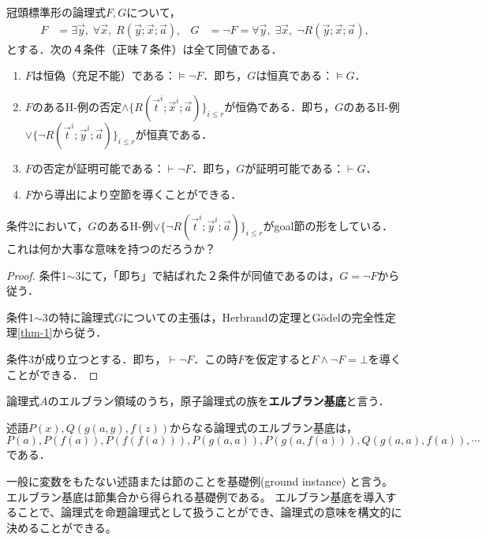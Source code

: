 \documentclass[uplatex, 12pt, dvipdfmx]{jsreport}
\begin{document}
\begin{corollary}\label{cor-Herbrand}
    冠頭標準形の論理式$F,G$について，
    \begin{align*}
        F&=\exists\vec{y},\;\forall\vec{x},\;R(\vec{y};\vec{x};\vec{a}),& G&=\lnot F=\forall\vec{y},\;\exists\vec{x},\;\lnot R(\vec{y};\vec{x};\vec{a}),
    \end{align*}
    とする．次の４条件（正味７条件）は全て同値である．
    \begin{enumerate}
        \item $F$は恒偽（充足不能）である：$\vDash\lnot F$．即ち，$G$は恒真である：$\vDash G$．
        \item $F$のあるH-例の否定$\land\{R(\vec{t}^i;\vec{x}^i;\vec{a})\}_{i\le r}$が恒偽である．即ち，$G$のあるH-例$\lor\{\lnot R(\vec{t}^i;\vec{y}^i;\vec{a})\}_{i\le r}$が恒真である．
        \item $F$の否定が証明可能である：$\vdash\lnot F$．即ち，$G$が証明可能である：$\vdash G$．
        \item $F$から導出により空節を導くことができる．
    \end{enumerate}
\end{corollary}
\begin{remark}
    条件2において，$G$のあるH-例$\lor\{\lnot R(\vec{t}^i;\vec{y}^i;\vec{a})\}_{i\le r}$がgoal節の形をしている．
    これは何か大事な意味を持つのだろうか？
\end{remark}
\begin{proof}
    条件1$\sim$3にて，「即ち」で結ばれた２条件が同値であるのは，$G=\lnot F$から従う．

    条件1$\sim$3の特に論理式$G$についての主張は，Herbrandの定理とGödelの完全性定理\ref{thm-1}から従う．

    条件3が成り立つとする．即ち，$\vdash\lnot F$．この時$F$を仮定すると$F\land\lnot F=\bot$を導くことができる．
\end{proof}

\begin{definition}
    論理式$A$のエルブラン領域のうち，原子論理式の族を\textbf{エルブラン基底}と言う．
\end{definition}
\begin{example}
    述語$P(x),Q(g(a,y),f(z))$からなる論理式のエルブラン基底は，
    \[P(a),P(f(a)),P(f(f(a))),P(g(a,a)),P(g(a,f(a))),Q(g(a,a),f(a)),\cdots\]である．
\end{example}
\begin{remark}
    一般に変数をもたない述語または節のことを基礎例(ground instance) と言う。
    エルブラン基底は節集合から得られる基礎例である。
    エルブラン基底を導入することで、論理式を命題論理式として扱うことができ、論理式の意味を構文的に決めることができる。
\end{remark}
\end{document}
